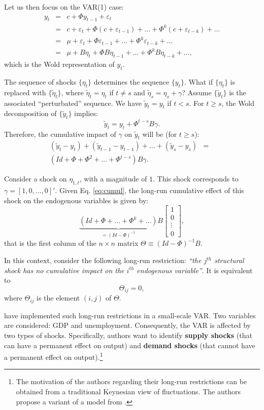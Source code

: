 \documentclass[
  12pt,
]{book}
\theoremstyle{definition}
\theoremstyle{definition}
\theoremstyle{definition}
\theoremstyle{definition}
\theoremstyle{remark}
\begin{document}
Let us then focus on the VAR(1) case:
\begin{eqnarray*}
y_{t} &=& c+\Phi y_{t-1}+\varepsilon_{t}\\
& = & c+\varepsilon_{t}+\Phi(c+\varepsilon_{t-1})+\ldots+\Phi^{k}(c+\varepsilon_{t-k})+\ldots \\
& = & \mu +\varepsilon_{t}+\Phi\varepsilon_{t-1}+\ldots+\Phi^{k}\varepsilon_{t-k}+\ldots \\
& = & \mu +B\eta_{t}+\Phi B\eta_{t-1}+\ldots+\Phi^{k}B\eta_{t-k}+\ldots,
\end{eqnarray*}
which is the Wold representation of \(y_t\).

The sequence of shocks \(\{\eta_t\}\) determines the sequence \(\{y_t\}\). What if \(\{\eta_t\}\) is replaced with \(\{\tilde{\eta}_t\}\), where \(\tilde{\eta}_t=\eta_t\) if \(t \ne s\) and \(\tilde{\eta}_s=\eta_s + \gamma\)? Assume \(\{\tilde{y}_t\}\) is the associated ``perturbated'' sequence. We have \(\tilde{y}_t = y_t\) if \(t<s\). For \(t \ge s\), the Wold decomposition of \(\{\tilde{y}_t\}\) implies:
\[
\tilde{y}_t = y_t + \Phi^{t-s} B \gamma.
\]
Therefore, the cumulative impact of \(\gamma\) on \(\tilde{y}_t\) will be (for \(t \ge s\)):
\begin{eqnarray}
(\tilde{y}_t - y_t) +  (\tilde{y}_{t-1} - y_{t-1}) + \dots +  (\tilde{y}_s - y_s) &=& \nonumber \\
(Id + \Phi + \Phi^2 + \dots + \Phi^{t-s}) B \gamma.&& \label{eq:cumul}
\end{eqnarray}

Consider a shock on \(\eta_{1,t}\), with a magnitude of \(1\). This shock corresponds to \(\gamma = [1,0,\dots,0]'\). Given Eq. \eqref{eq:cumul}, the long-run cumulative effect of this shock on the endogenous variables is given by:
\[
\underbrace{(Id+\Phi+\ldots+\Phi^{k}+\ldots)}_{=(Id - \Phi)^{-1}}B\left[\begin{array}{c}
1\\
0\\
\vdots\\
0\end{array}\right],
\]
that is the first column of the \(n \times n\) matrix \(\Theta \equiv (Id - \Phi)^{-1}B\).

In this context, consider the following long-run restriction: \emph{``the \(j^{th}\) structural shock has no cumulative impact on the \(i^{th}\) endogenous variable''}. It is equivalent to
\[
\Theta_{ij}=0,
\]
where \(\Theta_{ij}\) is the element \((i,j)\) of \(\Theta\).

\citet{Blanchard_Quah_1989} have implemented such long-run restrictions in a small-scale VAR. Two variables are considered: GDP and unemployment. Consequently, the VAR is affected by two types of shocks. Specifically, authors want to identify \textbf{supply shocks} (that can have a permanent effect on output) and \textbf{demand shocks} (that cannot have a permanent effect on output).\footnote{The motivation of the authors regarding their long-run restrictions can be obtained from a traditional Keynesian view of fluctuations. The authors propose a variant of a model from \citet{Fischer_1977}.
}
\end{document}
